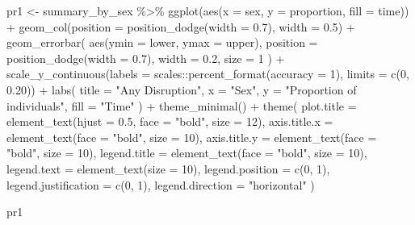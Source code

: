 \documentclass[
  letterpaper,
  DIV=11,
  numbers=noendperiod]{scrartcl}
\newenvironment{Shaded}{\begin{snugshade}}{\end{snugshade}}
\newcommand{\AttributeTok}[1]{\textcolor[rgb]{0.40,0.45,0.13}{#1}}
\newcommand{\DecValTok}[1]{\textcolor[rgb]{0.68,0.00,0.00}{#1}}
\newcommand{\FloatTok}[1]{\textcolor[rgb]{0.68,0.00,0.00}{#1}}
\newcommand{\FunctionTok}[1]{\textcolor[rgb]{0.28,0.35,0.67}{#1}}
\newcommand{\NormalTok}[1]{\textcolor[rgb]{0.00,0.23,0.31}{#1}}
\newcommand{\OtherTok}[1]{\textcolor[rgb]{0.00,0.23,0.31}{#1}}
\newcommand{\SpecialCharTok}[1]{\textcolor[rgb]{0.37,0.37,0.37}{#1}}
\newcommand{\StringTok}[1]{\textcolor[rgb]{0.13,0.47,0.30}{#1}}
\begin{document}
\begin{Shaded}
\begin{Highlighting}[]
\NormalTok{pr1 }\OtherTok{\textless{}{-}}\NormalTok{ summary\_by\_sex }\SpecialCharTok{\%\textgreater{}\%} 
\FunctionTok{ggplot}\NormalTok{(}\FunctionTok{aes}\NormalTok{(}\AttributeTok{x =}\NormalTok{ sex, }\AttributeTok{y =}\NormalTok{ proportion, }\AttributeTok{fill =}\NormalTok{ time)) }\SpecialCharTok{+}
  \FunctionTok{geom\_col}\NormalTok{(}\AttributeTok{position =} \FunctionTok{position\_dodge}\NormalTok{(}\AttributeTok{width =} \FloatTok{0.7}\NormalTok{), }\AttributeTok{width =} \FloatTok{0.5}\NormalTok{) }\SpecialCharTok{+}
  \FunctionTok{geom\_errorbar}\NormalTok{(}
    \FunctionTok{aes}\NormalTok{(}\AttributeTok{ymin =}\NormalTok{ lower, }\AttributeTok{ymax =}\NormalTok{ upper),}
    \AttributeTok{position =} \FunctionTok{position\_dodge}\NormalTok{(}\AttributeTok{width =} \FloatTok{0.7}\NormalTok{),}
    \AttributeTok{width =} \FloatTok{0.2}\NormalTok{,}
    \AttributeTok{size =} \DecValTok{1}
\NormalTok{  ) }\SpecialCharTok{+}
  \FunctionTok{scale\_y\_continuous}\NormalTok{(}\AttributeTok{labels =}\NormalTok{ scales}\SpecialCharTok{::}\FunctionTok{percent\_format}\NormalTok{(}\AttributeTok{accuracy =} \DecValTok{1}\NormalTok{), }\AttributeTok{limits =} \FunctionTok{c}\NormalTok{(}\DecValTok{0}\NormalTok{, }\FloatTok{0.20}\NormalTok{)) }\SpecialCharTok{+}
  \FunctionTok{labs}\NormalTok{(}
    \AttributeTok{title =} \StringTok{"Any Disruption"}\NormalTok{,}
    \AttributeTok{x =} \StringTok{"Sex"}\NormalTok{,}
    \AttributeTok{y =} \StringTok{"Proportion of individuals"}\NormalTok{,}
    \AttributeTok{fill =} \StringTok{"Time"}
\NormalTok{  ) }\SpecialCharTok{+}
  \FunctionTok{theme\_minimal}\NormalTok{() }\SpecialCharTok{+}
  \FunctionTok{theme}\NormalTok{(}
    \AttributeTok{plot.title =} \FunctionTok{element\_text}\NormalTok{(}\AttributeTok{hjust =} \FloatTok{0.5}\NormalTok{, }\AttributeTok{face =} \StringTok{"bold"}\NormalTok{, }\AttributeTok{size =} \DecValTok{12}\NormalTok{),}
    \AttributeTok{axis.title.x =} \FunctionTok{element\_text}\NormalTok{(}\AttributeTok{face =} \StringTok{"bold"}\NormalTok{, }\AttributeTok{size =} \DecValTok{10}\NormalTok{),}
    \AttributeTok{axis.title.y =} \FunctionTok{element\_text}\NormalTok{(}\AttributeTok{face =} \StringTok{"bold"}\NormalTok{, }\AttributeTok{size =} \DecValTok{10}\NormalTok{),}
    \AttributeTok{legend.title =} \FunctionTok{element\_text}\NormalTok{(}\AttributeTok{face =} \StringTok{"bold"}\NormalTok{, }\AttributeTok{size =} \DecValTok{10}\NormalTok{),}
    \AttributeTok{legend.text =} \FunctionTok{element\_text}\NormalTok{(}\AttributeTok{size =} \DecValTok{10}\NormalTok{),}
    \AttributeTok{legend.position =} \FunctionTok{c}\NormalTok{(}\DecValTok{0}\NormalTok{, }\DecValTok{1}\NormalTok{), }
    \AttributeTok{legend.justification =} \FunctionTok{c}\NormalTok{(}\DecValTok{0}\NormalTok{, }\DecValTok{1}\NormalTok{),}
    \AttributeTok{legend.direction =} \StringTok{"horizontal"}
\NormalTok{  )}

\NormalTok{pr1}
\end{Highlighting}
\end{Shaded}
\end{document}
